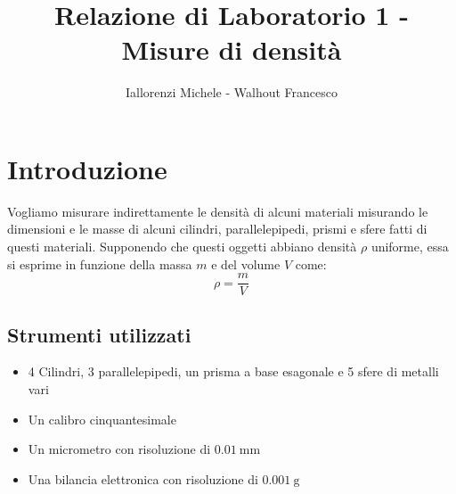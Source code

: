 \documentclass{article}
\title{Relazione di Laboratorio 1 - Misure di densità}
\author{Iallorenzi Michele - Walhout Francesco}
\begin{document}
    \maketitle

    \section{Introduzione}
    Vogliamo misurare indirettamente le densità di alcuni materiali misurando le
    dimensioni e le masse di alcuni cilindri, parallelepipedi, prismi e sfere fatti 
    di questi materiali.
    Supponendo che questi oggetti abbiano densità $\rho$ uniforme, essa si esprime
    in funzione della massa $m$ e del volume $V$ come:
    \begin{equation}
        \rho = \frac{m}{V}
        \label{eq:densità}
    \end{equation}
    \subsection{Strumenti utilizzati}
    \begin{itemize}
        \item 4 Cilindri, 3 parallelepipedi, un prisma a base esagonale e 5 
            sfere di metalli vari
        \item Un calibro cinquantesimale
        \item Un micrometro con risoluzione di $\SI{0.01}{\mm}$ 
        \item Una bilancia elettronica con risoluzione di $\SI{0.001}{\g}$
    \end{itemize}
\end{document}
